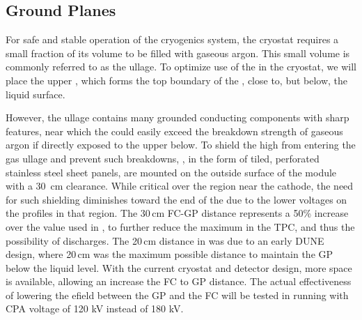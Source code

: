 


\subsection{Ground Planes}
\label{sec:fdsp-hv-des-fc-gp}

For safe and stable operation of the \lar cryogenics system, the cryostat requires a small fraction of its volume to be filled with gaseous argon. This small volume is commonly referred to as the ullage. To optimize use of the \lar in the cryostat, we will place the upper , which forms the top boundary of the , close to, but below, the liquid surface.

However, the ullage contains many grounded %
conducting components with sharp features, near which the \efield could easily exceed the breakdown strength of gaseous argon if directly exposed to the upper  below. To shield the high \efield from entering the gas ullage and prevent such breakdowns, %
, %
in the form of tiled, perforated stainless steel sheet panels, are mounted on the outside surface of the 
 module with a \SI{30}{\cm} clearance. While critical over the region near the cathode, the need for such shielding diminishes toward the  end of the  due to the lower voltages on the  profiles in that region. 
The 30\,cm FC-GP distance represents a 50\% increase over the value used in , to further reduce the maximum \efield in the TPC, and thus the possibility of discharges. The 20\,cm distance in  was due to an early DUNE design, where 20\,cm was the maximum possible distance to maintain the GP below the liquid level. With the current cryostat and detector design, more space is available, allowing an increase the FC to GP distance. The actual effectiveness of lowering the efield between the GP and the FC will be tested in  running with CPA voltage of 120 kV instead of 180 kV.
 


